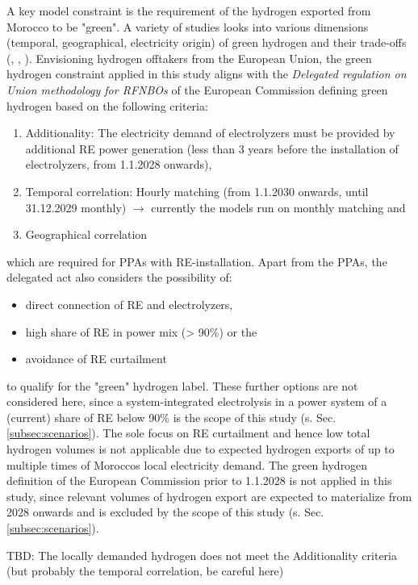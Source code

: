A key model constraint is the requirement of the hydrogen exported from Morocco to be "green". A variety of studies looks into various dimensions (temporal, geographical, electricity origin) of green hydrogen and their trade-offs (\cite{Brauer2022}, \cite{Ruhnau2022}, \cite{Zeyen2022}). Envisioning hydrogen offtakers from the European Union, the green hydrogen constraint applied in this study aligns with the \emph{Delegated regulation on Union methodology for RFNBOs} of the European Commission \cite{Commission2023} defining green hydrogen  based on the following criteria:

\begin{enumerate}
    \item Additionality: The electricity demand of electrolyzers must be provided by additional RE power generation (less than 3 years before the installation of electrolyzers, from 1.1.2028 onwards),
    \item Temporal correlation: Hourly matching (from 1.1.2030 onwards, until 31.12.2029 monthly) $\rightarrow$ currently the models run on monthly matching and
    \item Geographical correlation
\end{enumerate}
which are required for PPAs with RE-installation. Apart from the PPAs, the delegated act also considers the possibility of:
\begin{itemize}
    \item direct connection of RE and electrolyzers,
    \item high share of RE in power mix (> 90\%) or the
    \item avoidance of RE curtailment
\end{itemize}
to qualify for the "green" hydrogen label. These further options are not considered here, since a system-integrated electrolysis in a power system of a (current) share of RE below 90\% is the scope of this study (s. Sec. \ref{subsec:scenarios}). The sole focus on RE curtailment and hence low total hydrogen volumes is not applicable due to expected hydrogen exports of up to multiple times of Moroccos local electricity demand. The green hydrogen definition of the European Commission prior to 1.1.2028 is not applied in this study, since relevant volumes of hydrogen export are expected to materialize from 2028 onwards and is excluded by the scope of this study (s. Sec. \ref{subsec:scenarios}).

TBD: The locally demanded hydrogen does not meet the Additionality criteria (but probably the temporal correlation, be careful here)

